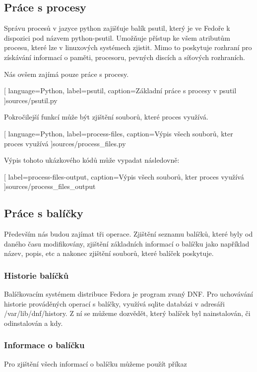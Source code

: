 \documentclass[10pt,a4paper]{article}
\begin{document}
		\subsection{Práce s procesy}
		Správu procesů v jazyce python zajišťuje balík psutil, který je ve Fedoře k dispozici pod názvem python-psutil. Umožňuje přístup ke všem atributům procesu, které lze v linuxových systémech zjistit. Mimo to poskytuje rozhraní pro získávání informací o paměti, procesoru, pevných discích a síťových rozhraních.

		Nás ovšem zajímá pouze práce s procesy.

		
		[
			language={Python},
			label=psutil,
			caption={Základní práce s procesy v psutil}
		]{sources/psutil.py}

		Pokročilejší funkcí může být zjištění souborů, které proces využívá.

		
		[
			language={Python},
			label=process-files,
			caption={Výpis všech souborů, kter proces využívá}
		]{sources/process_files.py}

		Výpis tohoto ukázkového kódů může vypadat následovně:

		
		[
			label=process-files-output,
			caption={Výpis všech souborů, kter proces využívá}
		]{sources/process_files_output}

		\subsection{Práce s balíčky}
			Především nás budou zajímat tři operace. Zjištění seznamu balíčků, které byly od daného času modifikovány, zjištění základních informací o balíčku jako například název, popis, etc a nakonec zjištění souborů, které balíček poskytuje.

			\subsubsection{Historie balíčků}
			Balíčkovacím systémem distribuce Fedora je program zvaný DNF\@. Pro uchovávání historie prováděných operací s balíčky, využívá sqlite databázi v adresáři /var/lib/dnf/history. Z ní se můžeme dozvědět, který balíček byl nainstalován, či odinstalován a kdy.


			\subsubsection{Informace o balíčku}
			Pro zjištění všech informací o balíčku můžeme použít příkaz
\end{document}
